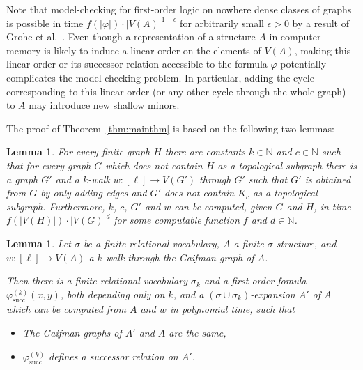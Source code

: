 \documentclass[12pt]{amsart}
\newtheorem{lemma}[theorem]{Lemma}
\newcommand{\absval}[1]{\left\vert #1 \right\vert}
\newcommand{\suc}{\mathrm{succ}}
\newcommand{\N}{\mathds{N}}
\begin{document}
Note that model-checking for first-order logic on nowhere dense
classes of graphs is possible in time $f(\absval{\varphi})\cdot
\absval{V(A)}^{1+\epsilon}$ for arbitrarily small $\epsilon > 0$ by a
result of Grohe et al.~\cite{gks14}. Even though a representation of a
structure $A$ in computer memory is likely to induce a linear order on
the elements of $V(A)$, making this linear order or its successor
relation accessible to the formula $\varphi$ potentially complicates
the model-checking problem. In particular, adding the cycle
corresponding to this linear order (or any other cycle through the
whole graph) to $A$ may introduce new shallow minors.

The proof of Theorem~\ref{thm:mainthm} is based on the following two lemmas:
\begin{lemma}
  \label{lem:kwalktopsub}
  For every finite graph $H$ there are constants $k \in \N$ and $c \in
  \N$ such that for every graph $G$ which does not contain $H$ as a
  topological subgraph there is a graph $G'$ and a $k$-walk $w :
  [\ell] \to V(G')$ through $G'$ such that $G'$ is obtained from $G$
  by only adding edges and $G'$ does not contain $K_c$ as a
  topological subgraph. Furthermore, $k$, $c$, $G'$ and $w$ can be
  computed, given $G$ and $H$, in time $f(\absval{V(H)})\cdot
  \absval{V(G)}^d$ for some computable function $f$ and $d \in \N$.
\end{lemma}
\begin{lemma}
  \label{lem:succfromkwalk}
  Let $\sigma$ be a finite relational vocabulary, $A$ a finite
  $\sigma$-structure, and $w:[\ell] \to V(A)$ a $k$-walk through the
  Gaifman graph of $A$.

  Then there is a finite relational vocabulary $\sigma_k$ and a
  first-order fomula $\varphi^{(k)}_{\suc}(x,y)$, both depending only
  on $k$, and a $(\sigma\cup\sigma_k)$-expansion $A'$ of $A$ which can
  be computed from $A$ and $w$ in polynomial time, such that
  \begin{itemize}
  \item The Gaifman-graphs of $A'$ and $A$ are the same,
  \item $\varphi^{(k)}_{\suc}$ defines a successor relation on $A'$.
  \end{itemize}
\end{lemma}
\end{document}
